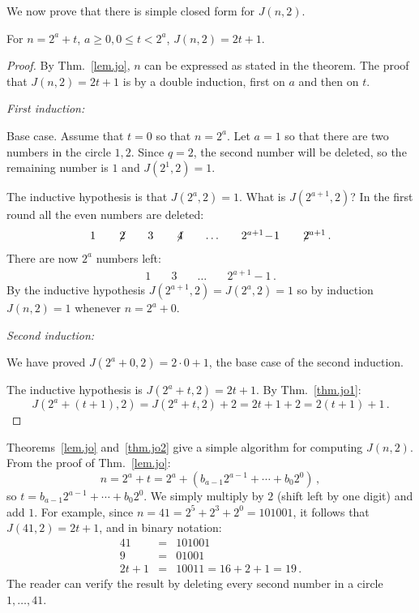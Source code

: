 We now prove that there is simple closed form for $J(n,2)$. 
\begin{theorem}\label{thm.jo2}
For $n=2^a+t$, $a\geq 0, 0\leq t < 2^a$, $J(n,2)=2t+1$.
\end{theorem}

\begin{proof}
By Thm.~\ref{lem.jo}, $n$ can be expressed as stated in the theorem. The proof that $J(n,2)=2t+1$ is by a double induction, first on $a$ and then on $t$.

\textit{First induction:}

Base case. Assume that $t=0$ so that $n=2^a$. Let $a=1$ so that there are two numbers in the circle $1,2$. Since $q=2$, the second number will be deleted, so the remaining number is $1$ and $J(2^1,2)=1$.

The inductive hypothesis is that $J(2^a,2)=1$. What is $J(2^{a+1},2)$? In the first round all the even numbers are deleted:
\[
\begin{array}{rrrrrrrrrrrrrrrrrrrrrrrrrrrr}
1&\quad\not\! 2&\quad3&\quad\not\! 4& \quad\ldots&\quad 2^{a+1}\!-\!1&\quad \not\! 2^{a+1}\,.
\end{array}
\]
There are now $2^a$ numbers left:
\[
\begin{array}{rrrrrrrrrrrrrrrrrrrrrrrrrrrr}
1&\quad3&\quad\ldots&\quad 2^{a+1}\!-\!1\,.
\end{array}
\]
By the inductive hypothesis $J(2^{a+1},2)=J(2^a,2)=1$ so by induction $J(n,2)=1$ whenever $n=2^a+0$.

\textit{Second induction:}

We have proved $J(2^a+0,2)=2\cdot 0 +1$, the base case of the second induction.

The inductive hypothesis is $J(2^a+t,2)=2t+1$. By Thm.~\ref{thm.jo1}:
\[
J(2^a+(t+1),2)=J(2^a+t,2)+2=2t+1+2=2(t+1)+1\,.
\]
\end{proof}


Theorems~\ref{lem.jo} and~\ref{thm.jo2} give a simple algorithm for computing $J(n,2)$. From the proof of Thm.~\ref{lem.jo}:
\[
n=2^a+t=2^a+(b_{a-1}2^{a-1}+\cdots+b_{0}2^{0})\,,
\]
so $t=b_{a-1}2^{a-1}+\cdots+b_{0}2^{0}$. We simply multiply by $2$ (shift left by one digit) and add $1$. For example, since $n=41=2^5+2^3+2^0=101001$, it follows that $J(41,2)=2t+1$, and in binary notation:
\begin{eqnarray*}
41&=&101001\\
9&=&01001\\
2t+1&=&10011=16+2+1=19\,.
\end{eqnarray*}
The reader can verify the result by deleting every second number in a circle $1,\ldots,41$.

